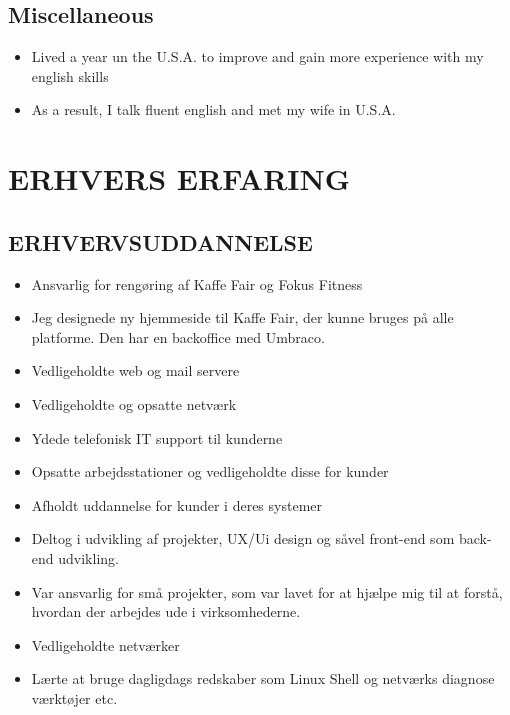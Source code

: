 \documentclass[11pt,a4paper,sans]{moderncv}        %
\begin{document}
\subsection{Miscellaneous}
\begin{itemize}
\item Lived a year un the U.S.A. to improve and gain more experience with my english skills
\item As a result, I talk fluent english and met my wife in U.S.A.
\end{itemize}
\bigskip
\else
\section{ERHVERS ERFARING}
\subsection{ERHVERVSUDDANNELSE}
\begin{itemize}
\item Ansvarlig for rengøring af Kaffe Fair og Fokus Fitness
\end{itemize}
\bigskip
{}
\begin{itemize}
\item Jeg designede ny hjemmeside til Kaffe Fair, der kunne bruges på alle platforme. Den har en backoffice med Umbraco.
\end{itemize}
\bigskip
{}
\begin{itemize}
\item Vedligeholdte web og mail servere
\item Vedligeholdte og opsatte netværk
\item Ydede telefonisk IT support til kunderne
\item Opsatte arbejdsstationer og vedligeholdte disse for kunder
\item Afholdt uddannelse for kunder i deres systemer
\item Deltog i udvikling af projekter, UX/Ui design og såvel front-end som back-end udvikling.
\end{itemize}
\bigskip
{}
\begin{itemize}
\item Var ansvarlig for små projekter, som var lavet for at hjælpe mig til at forstå, hvordan der arbejdes ude i virksomhederne.
\item Vedligeholdte netværker
\item Lærte at bruge dagligdags redskaber som Linux Shell og netværks diagnose værktøjer etc.
\end{itemize}
\bigskip
\end{document}
